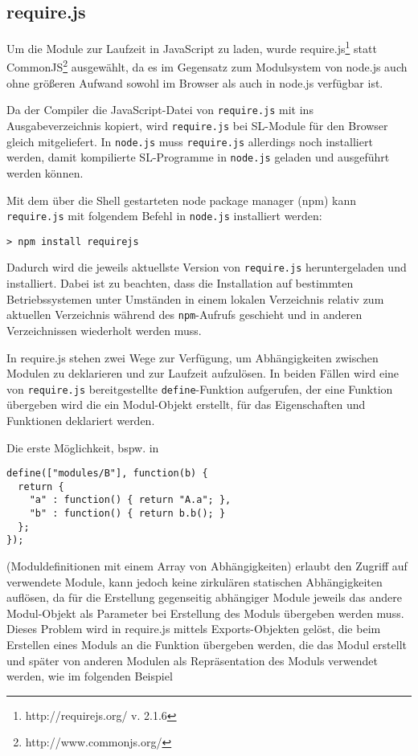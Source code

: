 \documentclass[runningheads]{llncs}
\begin{document}
\subsection{require.js}
\label{sec:compReq}

Um die Module zur Laufzeit in JavaScript zu laden, wurde
require.js\footnote{http://requirejs.org/ v. 2.1.6}
statt CommonJS\footnote{http://www.commonjs.org/} ausgewählt, da es im
Gegensatz zum Modulsystem von node.js auch ohne größeren Aufwand
sowohl im Browser als auch in node.js verfügbar ist.

Da der Compiler die JavaScript-Datei von \texttt{require.js} mit ins
Ausgabeverzeichnis kopiert, wird \texttt{require.js} bei SL-Module
für den Browser gleich mitgeliefert. In \texttt{node.js} muss
\texttt{require.js} allerdings noch installiert werden, damit
kompilierte SL-Programme in \texttt{node.js} geladen und ausgeführt
werden können.

Mit dem über die Shell gestarteten node package manager (npm) kann
\texttt{require.js} mit folgendem Befehl in \texttt{node.js}
installiert werden:

\begin{verbatim}
> npm install requirejs
\end{verbatim}

Dadurch wird die jeweils aktuellste Version von \texttt{require.js} heruntergeladen
und installiert. Dabei ist zu beachten, dass die Installation auf
bestimmten Betriebssystemen unter Umständen in einem lokalen Verzeichnis
relativ zum aktuellen Verzeichnis während des \texttt{npm}-Aufrufs
geschieht und in anderen Verzeichnissen wiederholt werden muss.

In require.js stehen zwei Wege zur Verfügung, um Abhängigkeiten zwischen
Modulen zu deklarieren und zur Laufzeit aufzulösen. In beiden Fällen
wird eine von \texttt{require.js} bereitgestellte
\texttt{define}-Funktion aufgerufen, der eine Funktion übergeben wird
die ein Modul-Objekt erstellt, für das Eigenschaften und Funktionen
deklariert werden.

Die erste Möglichkeit, bspw. in

\begin{verbatim}
define(["modules/B"], function(b) {
  return {
    "a" : function() { return "A.a"; },
    "b" : function() { return b.b(); }
  };
});
\end{verbatim}

(Moduldefinitionen mit einem Array von Abhängigkeiten) erlaubt den
Zugriff auf verwendete Module, kann jedoch keine zirkulären
statischen Abhängigkeiten auflösen, da
für die Erstellung gegenseitig abhängiger Module jeweils das
andere Modul-Objekt als Parameter bei Erstellung des Moduls übergeben
werden muss. Dieses Problem wird in require.js mittels
Exports-Objekten gelöst, die beim Erstellen eines Moduls an die Funktion
übergeben werden, die das Modul erstellt und später von anderen Modulen
als Repräsentation des Moduls verwendet werden, wie im folgenden
Beispiel
\end{document}
